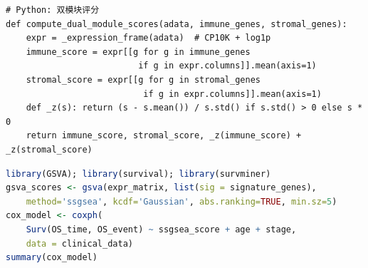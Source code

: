\documentclass[12pt, a4paper]{ctexart}
\begin{document}
\begin{lstlisting}[caption={双模块评分计算（Python）与 ssGSEA 评分（R）}]
# Python: 双模块评分
def compute_dual_module_scores(adata, immune_genes, stromal_genes):
    expr = _expression_frame(adata)  # CP10K + log1p
    immune_score = expr[[g for g in immune_genes
                          if g in expr.columns]].mean(axis=1)
    stromal_score = expr[[g for g in stromal_genes
                           if g in expr.columns]].mean(axis=1)
    def _z(s): return (s - s.mean()) / s.std() if s.std() > 0 else s * 0
    return immune_score, stromal_score, _z(immune_score) + _z(stromal_score)
\end{lstlisting}

\begin{lstlisting}[language=R, caption={ssGSEA + 多变量 Cox 回归（R）}]
library(GSVA); library(survival); library(survminer)
gsva_scores <- gsva(expr_matrix, list(sig = signature_genes),
    method='ssgsea', kcdf='Gaussian', abs.ranking=TRUE, min.sz=5)
cox_model <- coxph(
    Surv(OS_time, OS_event) ~ ssgsea_score + age + stage,
    data = clinical_data)
summary(cox_model)
\end{lstlisting}



\end{document}

